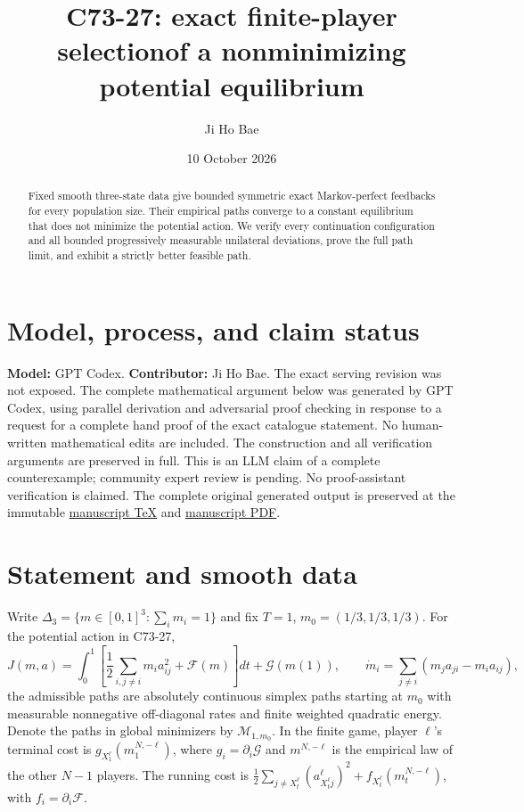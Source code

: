 \documentclass[11pt,a4paper]{article}
\title{C73-27: exact finite-player selection\newline of a nonminimizing potential equilibrium}
\author{Ji Ho Bae}
\date{10 October 2026}
\begin{document}
\maketitle
\section*{Model, process, and claim status}
\noindent\textbf{Model:} GPT Codex. \textbf{Contributor:} Ji Ho Bae.
The exact serving revision was not exposed.
The complete mathematical argument below was generated by GPT Codex,
using parallel derivation and adversarial proof checking in response to a
request for a complete hand proof of the exact catalogue statement.
No human-written mathematical edits are included. The construction and
all verification arguments are preserved in full.
This is an LLM claim of a complete counterexample; community expert review
is pending. No proof-assistant verification is claimed.
The complete original generated output is preserved at the immutable
\href{https://github.com/jbaelaw/finite-state-nonminimizing-selection/blob/58b261b80171ab6a1ddb94a9dab52ab6b50c0c3d/paper/Proof.tex}{manuscript TeX}
and \href{https://github.com/jbaelaw/finite-state-nonminimizing-selection/blob/58b261b80171ab6a1ddb94a9dab52ab6b50c0c3d/paper/Proof.pdf}{manuscript PDF}.

\begin{abstract}
Fixed smooth three-state data give bounded symmetric exact Markov-perfect
feedbacks for every population size. Their empirical paths converge to
a constant equilibrium that does not minimize the potential action.
We verify every continuation configuration and all bounded progressively
measurable unilateral deviations, prove the full path limit, and exhibit
a strictly better feasible path.
\end{abstract}

\section{Statement and smooth data}
Write $\Delta_3=\{m\in[0,1]^3:\sum_i m_i=1\}$ and fix
$T=1$, $m_0=(1/3,1/3,1/3)$. For the potential action in C73-27,
\begin{equation}\label{action}
 J(m,a)=\int_0^1\left[\frac12\sum_{i,j\ne i}m_i a_{ij}^2+
 \mathcal F(m)\right]dt+\mathcal G(m(1)),\qquad
 \dot m_i=\sum_{j\ne i}(m_ja_{ji}-m_ia_{ij}),
\end{equation}
the admissible paths are absolutely continuous simplex paths starting
at $m_0$ with measurable nonnegative off-diagonal rates and finite
weighted quadratic energy. Denote the paths in global minimizers by
$\mathcal M_{1,m_0}$. In the finite game, player $\ell$'s terminal cost is
$g_{X_1^\ell}(m_1^{N,-\ell})$, where $g_i=\partial_i\mathcal G$ and
$m^{N,-\ell}$ is the empirical law of the other $N-1$ players.
The running cost is $\frac12\sum_{j\ne X_t^\ell}(a^\ell_{X_t^\ell j})^2+
f_{X_t^\ell}(m_t^{N,-\ell})$, with $f_i=\partial_i\mathcal F$.
\end{document}
